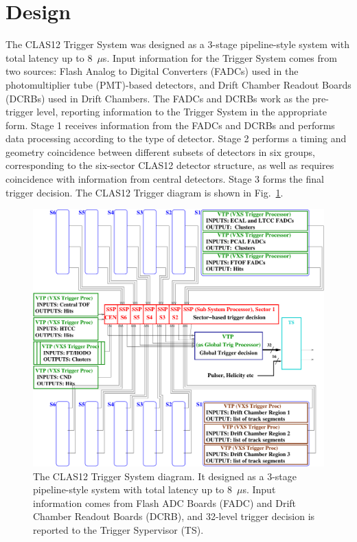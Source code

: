 \section{Design}

The CLAS12 Trigger System was designed as a 3-stage pipeline-style system with total latency up to 8~$\mu$s. Input information for the Trigger System comes from two sources:  Flash Analog to Digital Converters (FADCs) used in the photomultiplier tube (PMT)-based detectors, and Drift Chamber Readout Boards (DCRBs) used in Drift Chambers. The FADCs and DCRBs work as the pre-trigger level, reporting information to the Trigger System in the appropriate form. Stage 1 receives information from the FADCs and DCRBs and performs data processing according to the type of detector. Stage 2 performs a timing and geometry coincidence between different subsets of detectors in six groups, corresponding to the six-sector CLAS12 detector structure, as well as requires coincidence with information from central detectors. Stage 3 forms the final trigger decision. The CLAS12 Trigger diagram is shown in Fig.~\ref{fig:TriggerDiagram}.

\begin{figure}[hbt]
	\centering
	\includegraphics[width=1.0\columnwidth,keepaspectratio]{img/CLAS12_TRIGGER_1.pdf}
	\caption{The CLAS12 Trigger System diagram. It designed as a 3-stage pipeline-style system with total latency up to 8~$\mu$s. Input information comes from Flash ADC Boards (FADC) and Drift Chamber Readout Boards (DCRB), and 32-level trigger decision is reported to the Trigger Sypervisor (TS). }
	\label{fig:TriggerDiagram}
\end{figure}


